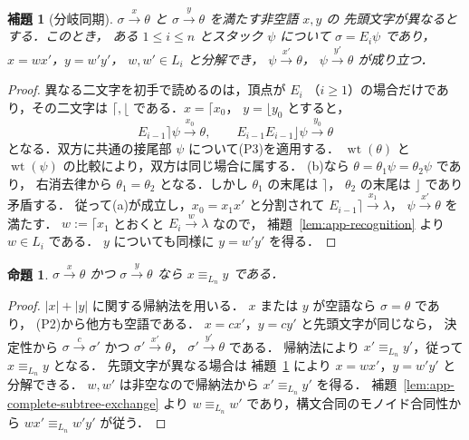 \documentclass[11pt,a4paper]{ltjsarticle}
\newtheorem{lemma}[theorem]{補題}
\newtheorem{proposition}[theorem]{命題}
\theoremstyle{remark}
\theoremstyle{plain}
\begin{document}
\begin{lemma}[分岐同期]\label{lem:app-branch-synchronization}
$\sigma\xrightarrow{x}\theta$ と
$\sigma\xrightarrow{y}\theta$ を満たす非空語 $x,y$ の
先頭文字が異なるとする．このとき，
ある $1\le i\le n$ とスタック $\psi$ について
$\sigma=E_i\psi$ であり，$x=wx'$，$y=w'y'$，
$w,w'\in L_i$ と分解でき，
$\psi\xrightarrow{x'}\theta$，
$\psi\xrightarrow{y'}\theta$ が成り立つ．
\end{lemma}
\begin{proof}
異なる二文字を初手で読めるのは，頂点が $E_i$
（$i\ge1$）の場合だけであり，その二文字は
$\lceil,\lfloor$ である．$x=\lceil x_0$，
$y=\lfloor y_0$ とすると，
\[
E_{i-1}\rceil\psi\xrightarrow{x_0}\theta,\qquad
E_{i-1}E_{i-1}\rfloor\psi\xrightarrow{y_0}\theta
\]
となる．双方に共通の接尾部 $\psi$ について(P3)を適用する．
$\operatorname{wt}(\theta)$ と $\operatorname{wt}(\psi)$
の比較により，双方は同じ場合に属する．
(b)なら $\theta=\theta_1\psi=\theta_2\psi$ であり，
右消去律から $\theta_1=\theta_2$ となる．しかし
$\theta_1$ の末尾は $\rceil$，
$\theta_2$ の末尾は $\rfloor$ であり矛盾する．
従って(a)が成立し，$x_0=x_1x'$ と分割されて
$E_{i-1}\rceil\xrightarrow{x_1}\lambda$，
$\psi\xrightarrow{x'}\theta$ を満たす．
$w:=\lceil x_1$ とおくと
$E_i\xrightarrow{w}\lambda$ なので，
補題~\ref{lem:app-recognition} より $w\in L_i$ である．
$y$ についても同様に $y=w'y'$ を得る．
\end{proof}

\begin{proposition}\label{prop:app-path-congruence}
$\sigma\xrightarrow{x}\theta$ かつ
$\sigma\xrightarrow{y}\theta$ なら
$x\equiv_{L_n}y$ である．
\end{proposition}
\begin{proof}
$|x|+|y|$ に関する帰納法を用いる．
$x$ または $y$ が空語なら $\sigma=\theta$ であり，
(P2)から他方も空語である．
$x=cx'$，$y=cy'$ と先頭文字が同じなら，
決定性から $\sigma\xrightarrow{c}\sigma'$ かつ
$\sigma'\xrightarrow{x'}\theta$，
$\sigma'\xrightarrow{y'}\theta$ である．
帰納法により $x'\equiv_{L_n}y'$，従って
$x\equiv_{L_n}y$ となる．
先頭文字が異なる場合は
補題~\ref{lem:app-branch-synchronization} により
$x=wx'$，$y=w'y'$ と分解できる．
$w,w'$ は非空なので帰納法から
$x'\equiv_{L_n}y'$ を得る．
補題~\ref{lem:app-complete-subtree-exchange} より
$w\equiv_{L_n}w'$ であり，構文合同のモノイド合同性から
$wx'\equiv_{L_n}w'y'$ が従う．
\end{proof}
\end{document}
